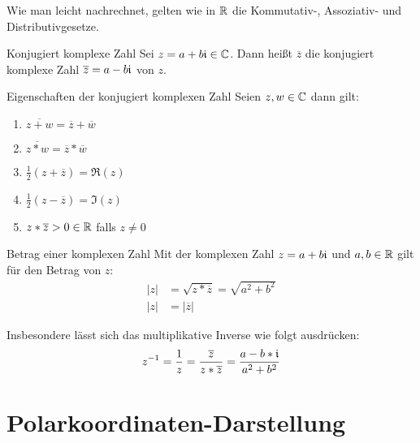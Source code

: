\bemerkung
Wie man leicht nachrechnet, gelten wie in $\mathbb{R}$ die Kommutativ-, Assoziativ- und Distributivgesetze.

\begin{definition}{Konjugiert komplexe Zahl}
	Sei $z=a+b\mathfrak{i}\in\mathbb{C}$. Dann heißt $\overline z$ die konjugiert komplexe Zahl $\overline z=a-b\mathfrak{i}$ von $z$.
\end{definition}

\begin{satz}{Eigenschaften der konjugiert komplexen Zahl}
  Seien $z,w\in\mathbb{C}$ dann gilt:
  \begin{enumerate}
    \item $\overline{z+w}=\overline z+\overline w$
    \item $\overline{z* w}=\overline z * \overline w$
    \item $\frac 1 2 (z+\overline z)=\Re(z)$
    \item $\frac 1 2 (z-\overline z)=\Im(z)$
    \item $z* \overline z > 0 \in\mathbb{R}$ falls $z\neq0$
  \end{enumerate}
\end{satz}

\begin{definition}{Betrag einer komplexen Zahl}
	Mit der komplexen Zahl $z=a+b\mathfrak{i}$ und $a,b\in\mathbb{R}$ gilt für den Betrag von $z$:
	\begin{align*}
	  |z|&=\sqrt{z*\overline z}=\sqrt{a^2+b^2}\\
	  |z|&=|\overline z|
	\end{align*}
\end{definition}

Insbesondere lässt sich das multiplikative Inverse wie folgt ausdrücken:
\begin{equation*}
  z^{-1}=\frac 1 z=\frac{\overline z}{z*\overline z}=\frac{a-b*\mathfrak{i}}{a^2+b^2}
\end{equation*}

\section{Polarkoordinaten-Darstellung}
